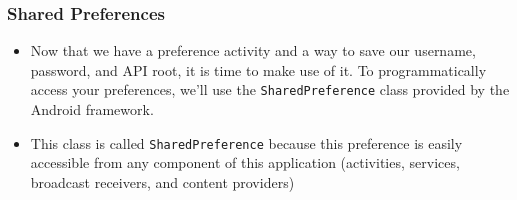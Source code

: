 \begin{frame}[containsverbatim]
\frametitle{Shared Preferences}
\begin{itemize}
\item Now that we have a preference activity and a way to save our username, password, and
API root, it is time to make use of it. To programmatically access your preferences, we'll
use the \texttt{SharedPreference} class provided by the Android framework.

\item This class is called \texttt{SharedPreference} because this preference is easily accessible from
any component of this application (activities, services, broadcast receivers, and content
providers)
\end{itemize}
\end{frame}
